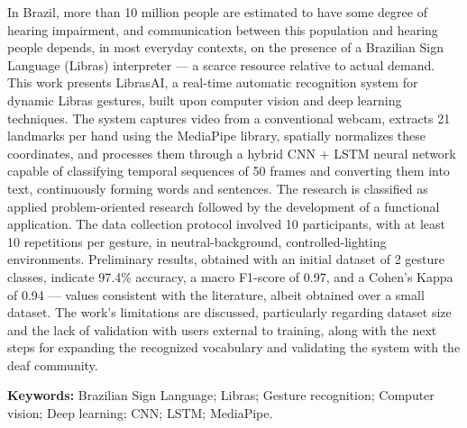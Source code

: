 \noindent In Brazil, more than 10 million people are estimated to have some
degree of hearing impairment, and communication between this population and
hearing people depends, in most everyday contexts, on the presence of a Brazilian
Sign Language (Libras) interpreter — a scarce resource relative to actual demand.
This work presents LibrasAI, a real-time automatic recognition system for dynamic
Libras gestures, built upon computer vision and deep learning techniques. The
system captures video from a conventional webcam, extracts 21 landmarks per hand
using the MediaPipe library, spatially normalizes these coordinates, and
processes them through a hybrid CNN + LSTM neural network capable of classifying
temporal sequences of 50 frames and converting them into text, continuously
forming words and sentences. The research is classified as applied
problem-oriented research followed by the development of a functional
application. The data collection protocol involved 10 participants, with at least
10 repetitions per gesture, in neutral-background, controlled-lighting
environments. Preliminary results, obtained with an initial dataset of 2 gesture
classes, indicate 97.4\% accuracy, a macro F1-score of 0.97, and a Cohen's Kappa
of 0.94 — values consistent with the literature, albeit obtained over a small
dataset. The work's limitations are discussed, particularly regarding dataset
size and the lack of validation with users external to training, along with the
next steps for expanding the recognized vocabulary and validating the system with
the deaf community.

\vspace{0.4cm}
\noindent\textbf{Keywords:} Brazilian Sign Language; Libras; Gesture recognition;
Computer vision; Deep learning; CNN; LSTM; MediaPipe.
\endgroup
\newpage
